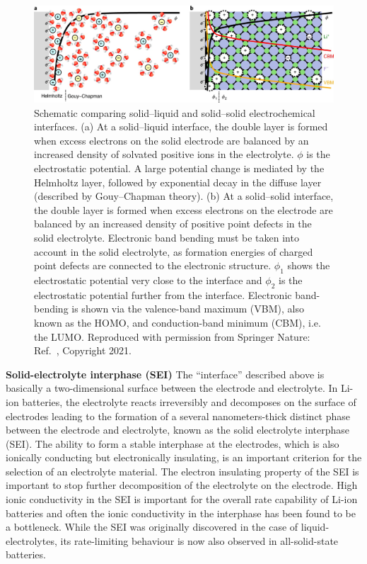 \documentclass[../main.tex]{subfiles}
\begin{document}
\begin{figure}
    \centering
    \includegraphics[scale=0.35]{figures/edl.jpg}
    \caption{Schematic comparing solid–liquid and solid–solid electrochemical interfaces. (a) At a solid–liquid interface, the double layer is formed when excess electrons on the solid electrode are balanced by an increased density of solvated positive ions in the electrolyte. $\phi$ is the electrostatic potential. A large potential change is mediated by the Helmholtz layer, followed by exponential decay in the diffuse layer (described by Gouy–Chapman theory). (b) At a solid–solid interface, the double layer is formed when excess electrons on the electrode are balanced by an increased density of positive point defects in the solid electrolyte. Electronic band bending must be taken into account in the solid electrolyte, as formation energies of charged point defects are connected to the electronic structure. $\phi_1$ shows the electrostatic potential very close to the interface and $\phi_2$ is the electrostatic potential further from the interface. Electronic band-bending is shown via the valence-band maximum (VBM), also known as the HOMO, and conduction-band minimum (CBM), i.e. the LUMO. Reproduced with permission from Springer Nature: Ref.~, Copyright 2021.}
    \label{fig:edl}
\end{figure}

\textbf{Solid-electrolyte interphase (SEI)} The ``interface'' described above is basically a two-dimensional surface between the electrode and electrolyte. In Li-ion batteries, the electrolyte reacts irreversibly and decomposes on the surface of electrodes leading to the formation of a several nanometers-thick distinct phase between the electrode and electrolyte, known as the solid electrolyte interphase (SEI).\cite{Xu2011} The ability to form a stable interphase at the electrodes, which is also ionically conducting but electronically insulating, is an important criterion for the selection of an electrolyte material. The electron insulating property of the SEI is important to stop further decomposition of the electrolyte on the electrode.\cite{Xu2004,Goodenough2010} High ionic conductivity in the SEI is important for the overall rate capability of Li-ion batteries and often the ionic conductivity in the interphase has been found to be a bottleneck.\cite{Wang2018, Xu2014} While the SEI was originally discovered in the case of liquid-electrolytes, its rate-limiting behaviour is now also observed in all-solid-state batteries.\cite{Yu2017}
\end{document}
